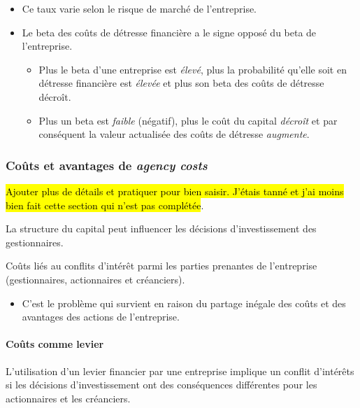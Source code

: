\documentclass[10pt, french]{article}
\begin{document}
\begin{multicols*}{2}
\begin{definitionNOHFILLpropos}
\begin{itemize}
	\item	Ce taux varie selon le risque de marché de l'entreprise.
	\item	Le beta des coûts de détresse financière a le signe opposé du beta de l'entreprise.
		\begin{itemize}
		\item	Plus le beta d'une entreprise est \textit{élevé}, plus la probabilité qu'elle soit en détresse financière est \textit{élevée} et plus son beta des coûts de détresse décroît.
		\item	Plus un beta est \textit{faible} (négatif), plus le coût du capital \textit{décroît} et par conséquent la valeur actualisée des coûts de détresse \textit{augmente}.
		\end{itemize}
\end{itemize}
\end{definitionNOHFILLpropos}


\subsubsection{Coûts et avantages de \og \textit{agency costs} \fg{}}
\hl{Ajouter plus de détails et pratiquer pour bien saisir. J'étais tanné et j'ai moins bien fait cette section qui n'est pas complétée}.

La structure du capital peut influencer les décisions d'investissement des gestionnaires. 
\begin{definitionNOHFILL}
Coûts liés au conflits d'intérêt parmi les parties prenantes de l'entreprise (gestionnaires, actionnaires et créanciers). 
\begin{itemize}
	\item	C'est le problème qui survient en raison du partage inégale des coûts et des avantages des actions de l'entreprise.
\end{itemize}
\end{definitionNOHFILL}


\paragraph{Coûts comme levier}	L'utilisation d'un levier financier par une entreprise implique un conflit d'intérêts si les décisions d'investissement ont des conséquences différentes pour les actionnaires et les créanciers.


\end{multicols*}
\end{document}
